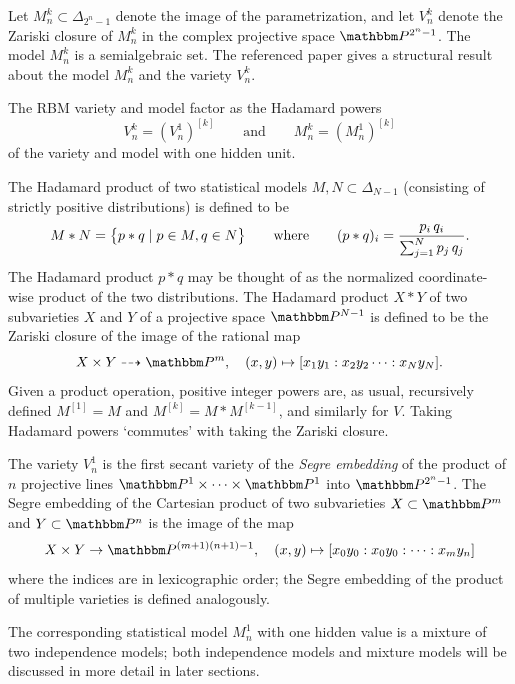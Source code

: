 \documentclass[11pt,titlepage]{article}
\numberwithin{equation}{section}
\begin{document}
    Let $M_n^k \subset \Delta_{2^n-1}$ denote the image of the parametrization,
    and let $V_n^k$ denote the Zariski closure of $M_n^k$ in the complex
    projective space $\Proj^{2^n-1}$.  The model $M_n^k$ is a semialgebraic set.
    The referenced paper gives a structural result about the model $M_n^k$ and
    the variety $V_n^k$.
    \begin{theorem} \label{thm:factor}
    The RBM variety and model factor as the Hadamard powers
    \[
        V_n^k = (V_n^1)^{[k]}
        \qquad\text{and}\qquad
        M_n^k = (M_n^1)^{[k]}
    \]
    of the variety and model with one hidden unit.
    \end{theorem}
    \noindent The Hadamard product of two statistical models $M, N \subset
    \Delta_{N-1}$ (consisting of strictly positive distributions) is defined to
    be
    \[
        M * N = \cdil[\big]{p * q \mid p \in M, q \in N}
        \qquad
        \text{where}
        \qquad
        (p * q)_i = \frac{p_i\,q_i}{\sum_{j=1}^N p_j\,q_j}.
    \]
    The Hadamard product $p*q$ may be thought of as the normalized
    coordinate-wise product of the two distributions.  The Hadamard product $X *
    Y$ of two subvarieties $X$ and $Y$ of a projective space $\Proj^{N-1}$ is
    defined to be the Zariski closure of the image of the rational map
    \[
        X \times Y \dashrightarrow \Proj^m,
        \quad
        (x, y) \mapsto [x_1y_1 : x_2y_2\cdots : x_N y_N].
    \]
    Given a product operation, positive integer powers are, as usual,
    recursively defined $M^{[1]} = M$ and $M^{[k]} = M * M^{[k-1]}$, and
    similarly for $V$.  Taking Hadamard powers `commutes' with taking the
    Zariski closure.

    The variety $V_n^1$ is the first secant variety of the \emph{Segre
    embedding} of the product of $n$ projective lines $\Proj^1 \times \cdots
    \times \Proj^1$ into $\Proj^{2^n-1}$.  The Segre embedding of the Cartesian
    product of two subvarieties $X \subset \Proj^m$ and $Y \subset \Proj^n$ is
    the image of the map
    \[
        X \times Y \to \Proj^{(m+1)(n+1) - 1},
        \quad
        (x, y) \mapsto
        [x_0y_0: x_0 y_0 : \cdots : x_my_n]
    \]
    where the indices are in lexicographic order; the Segre embedding of the
    product of multiple varieties is defined analogously.
    
    The corresponding statistical model $M_n^1$ with one hidden value is a
    mixture of two independence models; both independence models and mixture
    models will be discussed in more detail in later sections.
\end{document}
